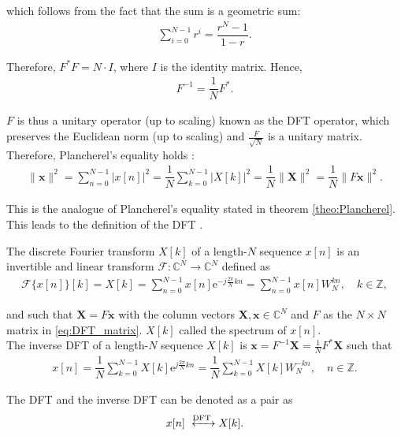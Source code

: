 which follows from the fact that the sum is a geometric sum:
\begin{align*}
\sum_{i=0}^{N-1} r^i = \dfrac{r^N-1}{1-r}.
\end{align*}

Therefore, $F^*F = N \cdot I$, where $I$ is the identity matrix. Hence,
\begin{align*}
F^{-1} = \dfrac{1}{N} F^*.
\end{align*}

$F$ is thus a unitary operator (up to scaling) known as the DFT operator, which preserves the Euclidean norm (up to scaling) and $\frac{F}{\sqrt{N}}$ is a unitary matrix. Therefore, Plancherel's equality holds \cite{page 258, FSP}:
\begin{align*}
\|\textbf{x}\|^2 = \sum_{n=0}^{N-1} |x[n]|^2 = \dfrac{1}{N} \sum_{k=0}^{N-1} |X[k]|^2 = \dfrac{1}{N} \|\textbf{X}\|^2 = \dfrac{1}{N} \|F\textbf{x}\|^2.
\end{align*}

This is the analogue of Plancherel's equality stated in theorem \ref{theo:Plancherel}. This leads to the definition of the DFT \cite{page 253, FSP}.

\begin{definition} \label{def:DFT}
The discrete Fourier transform $X[k]$ of a length-$N$ sequence $x[n]$ is an invertible and linear transform $\mathcal{F}: \mathbb{C}^N \to \mathbb{C}^N$ defined as
\begin{align} \label{eq:def_DFT}
\mathcal{F}\{x[n]\}[k] = X[k] = \sum_{n=0}^{N-1} x[n] \text{e}^{-j\frac{2 \pi}{N}kn} = \sum_{n=0}^{N-1} x[n] W_N^{kn}, \quad k \in \mathbb{Z},
\end{align}

and such that $\textbf{X} = F\textbf{x}$ with the column vectors $\textbf{X}, \textbf{x} \in \mathbb{C}^N$ and $F$ as the $N\times N$ matrix in \eqref{eq:DFT_matrix}. $X[k]$ called the spectrum of $x[n]$. \\
The inverse DFT of a length-$N$ sequence $X[k]$ is $\textbf{x} = F^{-1} \textbf{X} = \frac{1}{N} F^* \textbf{X}$ such that
\begin{align*}
x[n] = \dfrac{1}{N}\sum_{k=0}^{N-1} X[k] \text{e}^{j\frac{2 \pi}{N}kn} = \dfrac{1}{N}\sum_{k=0}^{N-1} X[k] W_N^{-kn}, \quad n \in \mathbb{Z}.
\end{align*}

The DFT and the inverse DFT can be denoted as a pair as
\begin{align*}
x[n] \xleftrightarrow{\text{DFT}} X[k].
\end{align*}
\end{definition}

